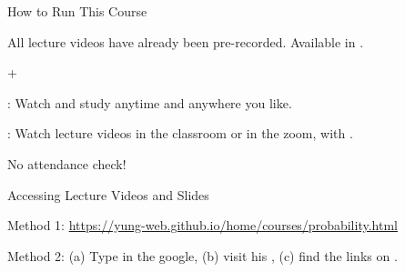 \begin{frame}{How to Run This Course}

\plitemsep 0.12in

\bci

\item<1-> All lecture videos have already been pre-recorded.
  Available in .
  
\item<2->  + 




\item<3->  : Watch and study anytime and anywhere you
  like. 
\item <4-> : Watch lecture videos
  in the classroom
  or in the zoom, with .


  \medskip
\item <5-> No attendance check!



  \eci

\end{frame}

\begin{frame}{Accessing Lecture Videos and Slides}

\plitemsep 0.03in

  \bci
\item<1-> Method 1: \url{https://yung-web.github.io/home/courses/probability.html}

\item<2-> Method 2: (a) Type  in the google, (b) visit his , (c) find the links on .

{
}
{
}
\eci

\end{frame}

